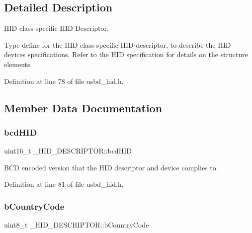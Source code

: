 \subsection{Detailed Description}
H\+ID class-\/specific H\+ID Descriptor. 

Type define for the H\+ID class-\/specific H\+ID descriptor, to describe the H\+ID device\textquotesingle{}s specifications. Refer to the H\+ID specification for details on the structure elements. 

Definition at line 78 of file usbd\+\_\+hid.\+h.



\subsection{Member Data Documentation}
\mbox{\label{struct___h_i_d___d_e_s_c_r_i_p_t_o_r_acb02b2afae4c474d60d3ce5ea90d6b3d}} 
\subsubsection{\texorpdfstring{bcd\+H\+ID}{bcdHID}}
{\footnotesize\ttfamily uint16\+\_\+t \+\_\+\+H\+I\+D\+\_\+\+D\+E\+S\+C\+R\+I\+P\+T\+O\+R\+::bcd\+H\+ID}

B\+CD encoded version that the H\+ID descriptor and device complies to. 

Definition at line 81 of file usbd\+\_\+hid.\+h.

\mbox{\label{struct___h_i_d___d_e_s_c_r_i_p_t_o_r_a6d494d09bf37ea067da3a089f0c966ba}} 
\subsubsection{\texorpdfstring{b\+Country\+Code}{bCountryCode}}
{\footnotesize\ttfamily uint8\+\_\+t \+\_\+\+H\+I\+D\+\_\+\+D\+E\+S\+C\+R\+I\+P\+T\+O\+R\+::b\+Country\+Code}

